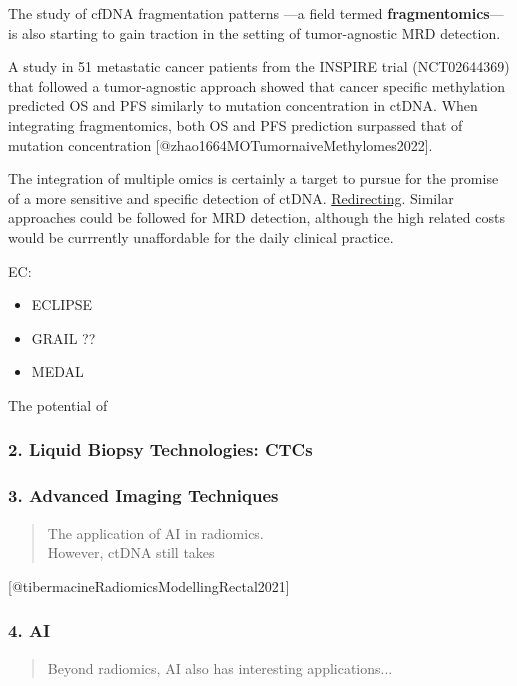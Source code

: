 \documentclass[
]{article}
\providecommand{\tightlist}{%
  \setlength{\itemsep}{0pt}\setlength{\parskip}{0pt}}
\begin{document}
The study of cfDNA fragmentation patterns ---a field termed
\textbf{fragmentomics}--- is also starting to gain traction in the
setting of tumor-agnostic MRD detection.

A study in 51 metastatic cancer patients from the INSPIRE trial
(NCT02644369) that followed a tumor-agnostic approach showed that cancer
specific methylation predicted OS and PFS similarly to mutation
concentration in ctDNA. When integrating fragmentomics, both OS and PFS
prediction surpassed that of mutation concentration
{[}@zhao1664MOTumornaiveMethylomes2022{]}.

The integration of multiple omics is certainly a target to pursue for
the promise of a more sensitive and specific detection of ctDNA.
\href{https://doi.org/10.1016/j.annonc.2022.07.1744}{Redirecting}.
Similar approaches could be followed for MRD detection, although the
high related costs would be currrently unaffordable for the daily
clinical practice.

EC:

\begin{itemize}
\tightlist
\item
  ECLIPSE
\item
  GRAIL ??\textquotesingle{}
\item
  MEDAL
\end{itemize}

The potential of

\subsubsection{2. Liquid Biopsy Technologies:
CTCs}\label{liquid-biopsy-technologies-ctcs}

\subsubsection{3. Advanced Imaging
Techniques}\label{advanced-imaging-techniques}

\begin{quote}
The application of AI in radiomics.\\
However, ctDNA still takes
\end{quote}

{[}@tibermacineRadiomicsModellingRectal2021{]}

\subsubsection{4. AI}\label{ai}

\begin{quote}
Beyond radiomics, AI also has interesting applications...
\end{quote}
\end{document}
